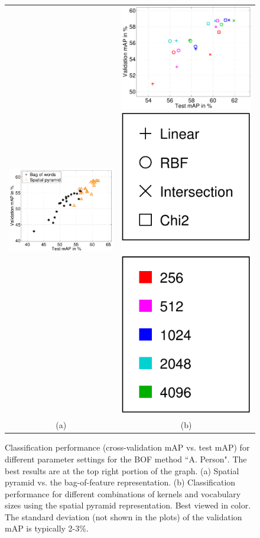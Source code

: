 \documentclass{bmvc2k}
\newcommand{\parnspc}{\vspace*{-4.2mm}}
\newcommand{\capnspc}{\vspace*{-4mm}}
\newcommand{\cfs}{\small}   %
\begin{document}
\begin{figure}[tbp]
\centering \small
\begin{tabular}{cc}
\includegraphics[height=.3\linewidth]{figs/caseA_error_BOF_PYR.pdf} &
\includegraphics[height=.3\linewidth]{figs/caseA_error_PYR.pdf}
\includegraphics[height=.3\linewidth]{figs/legend.pdf}\\
(a) & (b)  \\
\end{tabular}
\caption{\cfs Classification performance (cross-validation mAP vs. test mAP) for different parameter settings for the BOF method ``A. Person". The best results are at the top right portion of the graph.  (a) Spatial pyramid vs. the bag-of-feature representation.  (b) Classification performance for different combinations of kernels  and vocabulary sizes using the spatial pyramid representation.  Best viewed in color. The  standard deviation (not shown in the plots) of the validation mAP is typically 2-3\%. \normalsize 
}
 \label{fig:caseA}
 \capnspc
\end{figure}



\parnspc
\end{document}
